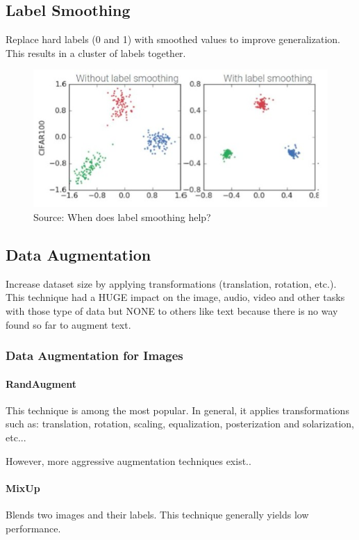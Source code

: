 \documentclass{article}
\begin{document}
\subsection{Label Smoothing}
Replace hard labels (0 and 1) with smoothed values to improve generalization. This results in a cluster of labels together.

\begin{figure}
    \centering
    \includegraphics[width=1\linewidth]{graphics/label-smoothing.jpg}
    \caption{Source: When does label smoothing help?}
    \label{fig:enter-label}
\end{figure}

\subsection{Data Augmentation}
Increase dataset size by applying transformations (translation, rotation, etc.). This technique had a HUGE impact on the image, audio, video and other tasks with those type of data but NONE to others like text because there is no way found so far to augment text.

\subsubsection{Data Augmentation for Images}

\paragraph{RandAugment} This technique is among the most popular. In general, it applies transformations such as: translation, rotation, scaling, equalization, posterization and solarization, etc...

However, more aggressive augmentation techniques exist..

\paragraph{MixUp} Blends two images and their labels. This technique generally yields low performance.
\end{document}
